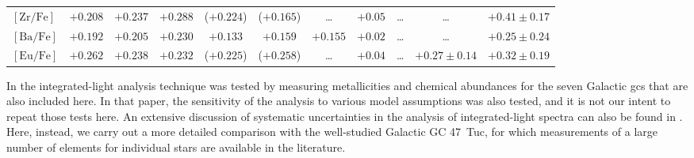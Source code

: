 \documentclass{aa}
\begin{document}
\begin{table*}
{\begin{tabular}{l c c c c c c c c c c}
$\mathrm{[Zr/Fe]}$  & $+0.208$  & $+0.237$  & $+0.288$  & ($+0.224$) & ($+0.165$) & \ldots & $+0.05$ & \ldots & \ldots & $+0.41\pm0.17$ \\
$\mathrm{[Ba/Fe]}$  & $+0.192$  & $+0.205$  & $+0.230$  & $+0.133$ & $+0.159$ & $+0.155$ & $+0.02$ & \ldots & \ldots & $+0.25\pm0.24$ \\
$\mathrm{[Eu/Fe]}$  & $+0.262$  & $+0.238$  &  $+0.232$  & ($+0.225$) & ($+0.258$) & \ldots & $+0.04$ & \ldots & $+0.27\pm0.14$ & $+0.32\pm0.19$ \\
\hline
\end{tabular}
}
\end{table*}

In  the integrated-light analysis technique was tested by measuring metallicities and chemical abundances for the seven Galactic \acp{gc} that are also included here. In that paper, the sensitivity of the analysis to various model assumptions was also tested, and it is not our intent to repeat those tests here. An extensive discussion of systematic uncertainties in the analysis of integrated-light spectra can also be found in \citet{Sakari2014}. Here, instead, we carry out a more detailed comparison with the well-studied Galactic GC 47~Tuc, for which measurements of a large number of elements for individual stars are available in the literature. 
\end{document}
